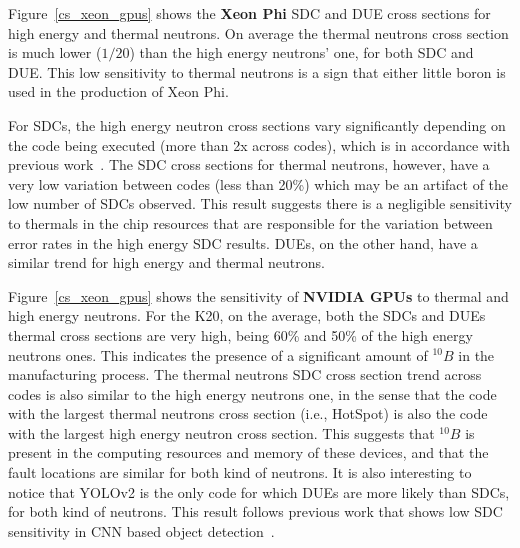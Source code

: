 Figure~\ref{cs_xeon_gpus} shows the \textbf{Xeon Phi} SDC and DUE cross sections for high energy and thermal neutrons. On  average the thermal neutrons cross section is much lower ($1/20$) than the high energy neutrons' one, for both SDC and DUE.
This low sensitivity to thermal neutrons is a sign that either little boron is used in the production of Xeon Phi.


For SDCs, the high energy neutron cross sections vary significantly depending on the code being executed (more than 2x across codes), which is in accordance with previous work~\cite{sc2017, fratin2018DSN}. The SDC cross sections for thermal neutrons, however, have a very low variation between codes (less than 20\%) which may be an artifact of the low number of SDCs observed. This result suggests there is a negligible sensitivity to thermals in the  chip resources that are responsible for the variation between error rates in the high energy SDC results.
DUEs, on the other hand, have a similar trend for high energy and thermal neutrons. %

Figure~\ref{cs_xeon_gpus} shows the sensitivity of \textbf{NVIDIA GPUs} to thermal and high energy neutrons.
For the K20, on the average, both the SDCs and DUEs thermal cross sections are very high, being 60\% and 50\% of the high energy neutrons ones. This indicates the presence of a significant amount of $^{10}B$ in the manufacturing process. The thermal neutrons SDC cross section trend across codes is also similar to the high energy neutrons one, in the sense that the code with the largest thermal neutrons cross section (i.e., HotSpot) is also the code with the largest high energy neutron cross section. This suggests that $^{10}B$ is present in the computing resources and memory of these devices, and that the fault locations are similar for both kind of neutrons. 
%
It is also interesting to notice that YOLOv2 is the only code for which DUEs are more likely than SDCs, for both kind of neutrons. This result follows previous work that shows low SDC sensitivity in CNN based object detection~\cite{ffsantos2018}. %

